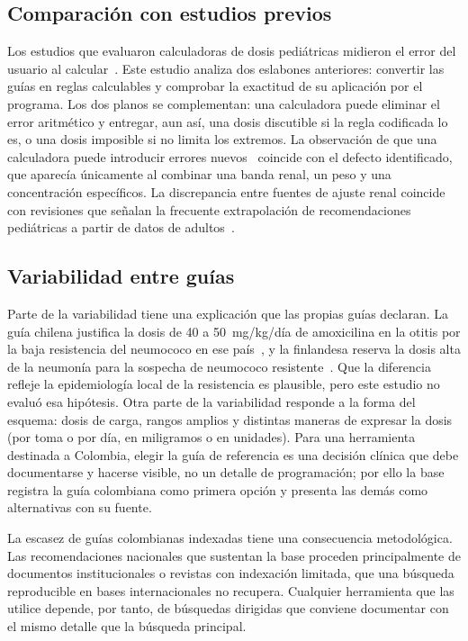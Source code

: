 \documentclass[11pt,a4paper]{article}
\begin{document}
\subsection{Comparación con estudios previos}

Los estudios que evaluaron calculadoras de dosis pediátricas midieron el error del usuario al calcular~\citep{vanderzanden2020,higi2023}. Este estudio analiza dos eslabones anteriores: convertir las guías en reglas calculables y comprobar la exactitud de su aplicación por el programa. Los dos planos se complementan: una calculadora puede eliminar el error aritmético y entregar, aun así, una dosis discutible si la regla codificada lo es, o una dosis imposible si no limita los extremos. La observación de que una calculadora puede introducir errores nuevos~\citep{vanderzanden2020} coincide con el defecto identificado, que aparecía únicamente al combinar una banda renal, un peso y una concentración específicos. La discrepancia entre fuentes de ajuste renal coincide con revisiones que señalan la frecuente extrapolación de recomendaciones pediátricas a partir de datos de adultos~\citep{schijvens2020,minotti2022}.

\subsection{Variabilidad entre guías}

Parte de la variabilidad tiene una explicación que las propias guías declaran. La guía chilena justifica la dosis de 40 a 50~mg/kg/día de amoxicilina en la otitis por la baja resistencia del neumococo en ese país~\citep{chileoma2019}, y la finlandesa reserva la dosis alta de la neumonía para la sospecha de neumococo resistente~\citep{backman2025}. Que la diferencia refleje la epidemiología local de la resistencia es plausible, pero este estudio no evaluó esa hipótesis. Otra parte de la variabilidad responde a la forma del esquema: dosis de carga, rangos amplios y distintas maneras de expresar la dosis (por toma o por día, en miligramos o en unidades). Para una herramienta destinada a Colombia, elegir la guía de referencia es una decisión clínica que debe documentarse y hacerse visible, no un detalle de programación; por ello la base registra la guía colombiana como primera opción y presenta las demás como alternativas con su fuente.

La escasez de guías colombianas indexadas tiene una consecuencia metodológica. Las recomendaciones nacionales que sustentan la base proceden principalmente de documentos institucionales o revistas con indexación limitada, que una búsqueda reproducible en bases internacionales no recupera. Cualquier herramienta que las utilice depende, por tanto, de búsquedas dirigidas que conviene documentar con el mismo detalle que la búsqueda principal.
\end{document}
